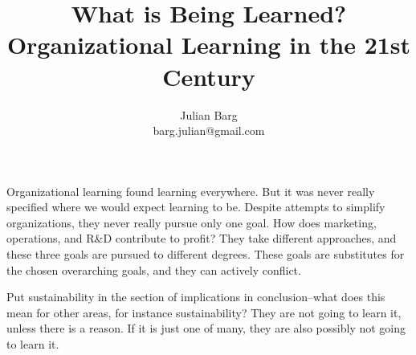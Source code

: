 \documentclass[12pt, man, natbib]{apa6}
\title{What is Being Learned? Organizational Learning in the 21st Century}
\author{Julian Barg\\barg.julian@gmail.com}
\affiliation{Ivey Business School}
\begin{document}
	
	\maketitle
	
	\singlespacing
	
	\section{}	
	Organizational learning found learning everywhere. But it was never really specified where we would expect learning to be. Despite attempts to simplify organizations, they never really pursue only one goal. How does marketing, operations, and R\&D contribute to profit? They take different approaches, and these three goals are pursued to different degrees. These goals are substitutes for the chosen overarching goals, and they can actively conflict.
	
	Put sustainability in the section of implications in conclusion--what does this mean for other areas, for instance sustainability? They are not going to learn it, unless there is a reason. If it is just one of many, they are also possibly not going to learn it.


\end{document}
